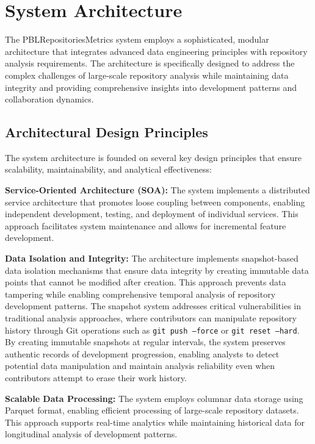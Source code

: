 \documentclass[12pt,a4paper]{article}
\begin{document}
\section{System Architecture}

The PBLRepositoriesMetrics system employs a sophisticated, modular architecture that integrates advanced data engineering principles with repository analysis requirements. The architecture is specifically designed to address the complex challenges of large-scale repository analysis while maintaining data integrity and providing comprehensive insights into development patterns and collaboration dynamics.

\subsection{Architectural Design Principles}

The system architecture is founded on several key design principles that ensure scalability, maintainability, and analytical effectiveness:

\textbf{Service-Oriented Architecture (SOA):} The system implements a distributed service architecture that promotes loose coupling between components, enabling independent development, testing, and deployment of individual services. This approach facilitates system maintenance and allows for incremental feature development.

\textbf{Data Isolation and Integrity:} The architecture implements snapshot-based data isolation mechanisms that ensure data integrity by creating immutable data points that cannot be modified after creation. This approach prevents data tampering while enabling comprehensive temporal analysis of repository development patterns. The snapshot system addresses critical vulnerabilities in traditional analysis approaches, where contributors can manipulate repository history through Git operations such as \texttt{git push --force} or \texttt{git reset --hard}. By creating immutable snapshots at regular intervals, the system preserves authentic records of development progression, enabling analysts to detect potential data manipulation and maintain analysis reliability even when contributors attempt to erase their work history.

\textbf{Scalable Data Processing:} The system employs columnar data storage using Parquet format, enabling efficient processing of large-scale repository datasets. This approach supports real-time analytics while maintaining historical data for longitudinal analysis of development patterns.
\end{document}
